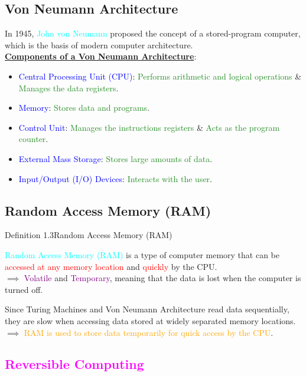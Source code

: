 \documentclass{book}
\begin{document}
\subsection{Von Neumann Architecture}
In 1945, \textcolor{cyan}{John von Neumann} proposed the concept of a stored-program computer, which is the basis of modern computer architecture.\\
\vspace{0.2cm}
\uline{\textbf{Components of a Von Neumann Architecture}}:
\begin{itemize}
    \item \textcolor{blue}{Central Processing Unit (CPU)}: \textcolor{forestgreen}{Performs arithmetic and logical operations} \& \textcolor{forestgreen}{Manages the data registers}.
    \item \textcolor{blue}{Memory}: \textcolor{forestgreen}{Stores data and programs}.
    \item \textcolor{blue}{Control Unit}: \textcolor{forestgreen}{Manages the instructions registers} \& \textcolor{forestgreen}{Acts as the program counter}.
    \item \textcolor{blue}{External Mass Storage}: \textcolor{forestgreen}{Stores large amounts of data}.
    \item \textcolor{blue}{Input/Output (I/O) Devices}: \textcolor{forestgreen}{Interacts with the user}.
\end{itemize}
\subsection{Random Access Memory (RAM)}
\begin{defBox}{Definition 1.3}{Random Access Memory (RAM)}
    \raggedright
    \textcolor{cyan}{Random Access Memory (RAM)} is a type of computer memory that can be \textcolor{red}{accessed at any memory location} and \textcolor{red}{quickly} by the CPU.\\
    $\implies$ \textcolor{purple}{Volatile} and \textcolor{purple}{Temporary}, meaning that the data is lost when the computer is turned off.
\end{defBox}
Since Turing Machines and Von Neumann Architecture read data sequentially, they are slow when accessing data stored at widely separated memory locations.\\
$\implies$ \textcolor{orange}{RAM is used to store data temporarily for quick access by the CPU}.
\newpage
\textcolor{magenta}{\section{\textbf{Reversible Computing}}}
\end{document}
